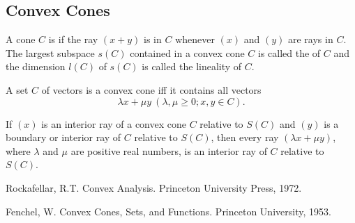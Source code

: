 \documentclass[11pt,a4paper]{article}
\begin{document}
\subsection*{Convex Cones}

\begin{definition}
    A cone $C$ is  if the ray $(x+y)$ is in $C$ whenever $(x)$ and $(y)$ are rays in $C$. The largest subspace $s(C)$ contained in a convex cone $C$ is called the  of $C$ and the dimension $l(C)$ of $s(C)$ is called the lineality of $C$.
\end{definition}

\begin{remark}
    A set $C$ of vectors is a convex cone iff it contains all vectors
    \begin{equation*}
    \lambda x + \mu y\ (\lambda, \mu \ge 0; x,y\in C).
    \end{equation*}
\end{remark}

\begin{lemma}
    If $(x)$ is an interior ray of a convex cone $C$ relative to $S(C)$ and $(y)$ is a boundary or interior ray of $C$ relative to $S(C)$, then every ray $(\lambda x+\mu y)$, where $\lambda$ and $\mu$ are positive real numbers, is an interior ray of $C$ relative to $S(C)$. 
\end{lemma}






\begin{thebibliography}{9}
    Rockafellar, R.T. Convex Analysis. Princeton University Press, 1972.
    
    Fenchel, W. Convex Cones, Sets, and Functions. Princeton University, 1953.
    
    
\end{thebibliography}
    
\end{document}
